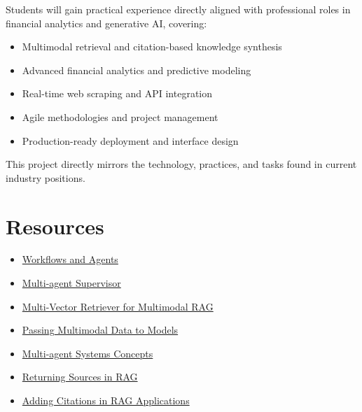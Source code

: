 \documentclass[12pt]{article}
\begin{document}
Students will gain practical experience directly aligned with professional roles in financial analytics and generative AI, covering:
\begin{itemize}[noitemsep]
    \item Multimodal retrieval and citation-based knowledge synthesis
    \item Advanced financial analytics and predictive modeling
    \item Real-time web scraping and API integration
    \item Agile methodologies and project management
    \item Production-ready deployment and interface design
\end{itemize}

This project directly mirrors the technology, practices, and tasks found in current industry positions.

\section*{Resources}
\begin{itemize}[noitemsep]
    \item \href{https://langchain-ai.github.io/langgraph/tutorials/workflows/}{Workflows and Agents}
    \item \href{https://langchain-ai.github.io/langgraph/tutorials/multi_agent/agent_supervisor/}{Multi-agent Supervisor}
    \item \href{https://blog.langchain.dev/semi-structured-multi-modal-rag/}{Multi-Vector Retriever for Multimodal RAG}
    \item \href{https://python.langchain.com/docs/how_to/multimodal_inputs/}{Passing Multimodal Data to Models}
    \item \href{https://langchain-ai.github.io/langgraph/concepts/multi_agent/}{Multi-agent Systems Concepts}
    \item \href{https://python.langchain.com/docs/how_to/qa_sources/}{Returning Sources in RAG}
    \item \href{https://python.langchain.com/docs/how_to/qa_citations/}{Adding Citations in RAG Applications}
\end{itemize}
\end{document}
